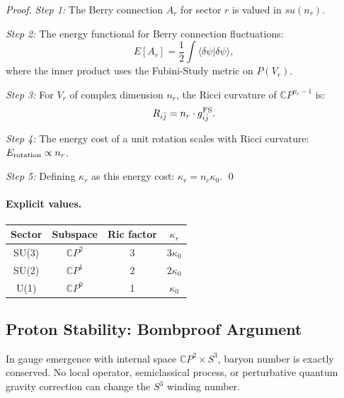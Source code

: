 \begin{proof}
\textit{Step 1:} The Berry connection $A_r$ for sector $r$ is valued in $su(n_r)$.

\textit{Step 2:} The energy functional for Berry connection fluctuations:
\begin{equation}
E[A_r] = \frac{1}{2}\int \langle \delta\psi | \delta\psi \rangle,
\end{equation}
where the inner product uses the Fubini-Study metric on $P(V_r)$.

\textit{Step 3:} For $V_r$ of complex dimension $n_r$, the Ricci curvature of 
$\mathbb{C}P^{n_r-1}$ is:
\begin{equation}
R_{i\bar{j}} = n_r \cdot g_{i\bar{j}}^{\rm FS}.
\end{equation}

\textit{Step 4:} The energy cost of a unit rotation scales with Ricci curvature:
$E_{\rm rotation} \propto n_r$.

\textit{Step 5:} Defining $\kappa_r$ as this energy cost: $\kappa_r = n_r \kappa_0$. \qed
\end{proof}

\paragraph{Explicit values.}
\begin{center}
\begin{tabular}{cccc}
\toprule
Sector & Subspace & Ric factor & $\kappa_r$ \\
\midrule
SU(3) & $\mathbb{C}P^2$ & 3 & $3\kappa_0$ \\
SU(2) & $\mathbb{C}P^1$ & 2 & $2\kappa_0$ \\
U(1) & $\mathbb{C}P^0$ & 1 & $\kappa_0$ \\
\bottomrule
\end{tabular}
\end{center}

\subsection{Proton Stability: Bombproof Argument}\label{app:proton-bombproof}

\begin{theorem}\label{thm:proton-bombproof}
In gauge emergence with internal space $\mathbb{C}P^2 \times S^3$, baryon number 
is exactly conserved. No local operator, semiclassical process, or perturbative 
quantum gravity correction can change the $S^3$ winding number.
\end{theorem}

